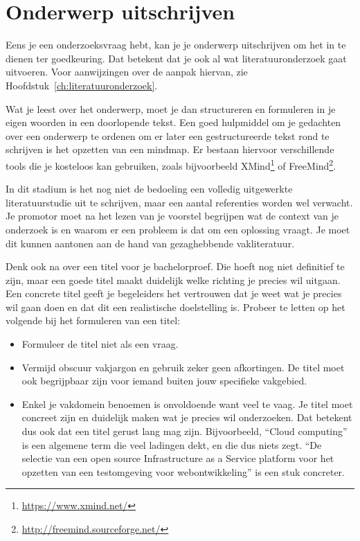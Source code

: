 \section{Onderwerp uitschrijven}%
\label{sec:onderwerp_uitschrijven}

Eens je een onderzoeksvraag hebt, kan je je onderwerp uitschrijven om het in te dienen ter goedkeuring. Dat betekent dat je ook al wat literatuuronderzoek gaat uitvoeren. Voor aanwijzingen over de aanpak hiervan, zie Hoofdstuk~\ref{ch:literatuuronderzoek}.

Wat je leest over het onderwerp, moet je dan structureren en formuleren in je eigen woorden in een doorlopende tekst. Een goed hulpmiddel om je gedachten over een onderwerp te ordenen om er later een gestructureerde tekst rond te schrijven is het opzetten van een mindmap. Er bestaan hiervoor verschillende tools die je kosteloos kan gebruiken, zoals bijvoorbeeld XMind\footnote{\url{https://www.xmind.net/}} of FreeMind\footnote{\url{http://freemind.sourceforge.net/}}.


In dit stadium is het nog niet de bedoeling een volledig uitgewerkte literatuurstudie uit te schrijven, maar een aantal referenties worden wel verwacht. Je promotor moet na het lezen van je voorstel begrijpen wat de context van je onderzoek is en waarom er een probleem is dat om een oplossing vraagt. Je moet dit kunnen aantonen aan de hand van gezaghebbende vakliteratuur.

Denk ook na over een titel voor je bachelorproef. Die hoeft nog niet definitief te zijn, maar een goede titel maakt duidelijk welke richting je precies wil uitgaan. Een concrete titel geeft je begeleiders het vertrouwen dat je weet wat je precies wil gaan doen en dat dit een realistische doelstelling is. Probeer te letten op het volgende bij het formuleren van een titel:

\begin{itemize}
  \item Formuleer de titel niet als een vraag.
  \item Vermijd obscuur vakjargon en gebruik zeker geen afkortingen. De titel moet ook begrijpbaar zijn voor iemand buiten jouw specifieke vakgebied.
  \item Enkel je vakdomein benoemen is onvoldoende want veel te vaag. Je titel moet concreet zijn en duidelijk maken wat je precies wil onderzoeken. Dat betekent dus ook dat een titel gerust lang mag zijn. Bijvoorbeeld, ``Cloud computing'' is een algemene term die veel ladingen dekt, en die dus niets zegt. ``De selectie van een open source Infrastructure as a Service platform voor het opzetten van een testomgeving voor webontwikkeling'' is een stuk concreter.
\end{itemize}

